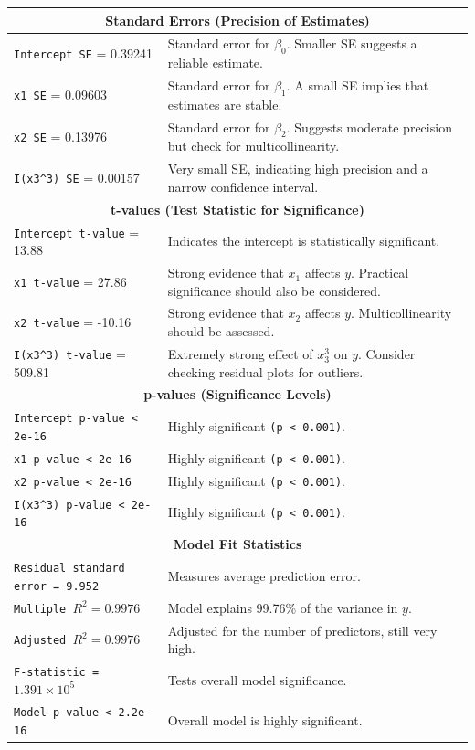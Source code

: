 \documentclass[]{article}
\begin{document}
\begin{longtable}{|p{}|p{}|}
	\hline
	\multicolumn{2}{|c|}{\textbf{Standard Errors (Precision of Estimates)}} \\
	\hline
	\texttt{Intercept SE} = 0.39241 & Standard error for $\beta_0$. Smaller SE suggests a reliable estimate. \\
	\hline
	\texttt{x1 SE} = 0.09603 & Standard error for $\beta_1$. A small SE implies that estimates are stable. \\
	\hline
	\texttt{x2 SE} = 0.13976 & Standard error for $\beta_2$. Suggests moderate precision but check for multicollinearity. \\
	\hline
	\texttt{I(x3\textasciicircum3) SE} = 0.00157 & Very small SE, indicating high precision and a narrow confidence interval. \\
	\hline
	\multicolumn{2}{|c|}{\textbf{t-values (Test Statistic for Significance)}} \\
	\hline
	\texttt{Intercept t-value} = 13.88 & Indicates the intercept is statistically significant. \\
	\hline
	\texttt{x1 t-value} = 27.86 & Strong evidence that $x_1$ affects $y$. Practical significance should also be considered. \\
	\hline
	\texttt{x2 t-value} = -10.16 & Strong evidence that $x_2$ affects $y$. Multicollinearity should be assessed. \\
	\hline
	\texttt{I(x3\textasciicircum3) t-value} = 509.81 & Extremely strong effect of $x_3^3$ on $y$. Consider checking residual plots for outliers. \\
	\hline


	\hline
	\multicolumn{2}{|c|}{\textbf{p-values (Significance Levels)}} \\
	\hline
	\texttt{Intercept p-value < 2e-16} & Highly significant \texttt{(p < 0.001)}. \\
	\hline
	\texttt{x1 p-value < 2e-16} & Highly significant \texttt{(p < 0.001)}. \\
	\hline
	\texttt{x2 p-value < 2e-16} & Highly significant \texttt{(p < 0.001)}. \\
	\hline
	\texttt{I(x3\textasciicircum3) p-value < 2e-16} & Highly significant \texttt{(p < 0.001)}. \\
	\hline

	\hline
	\multicolumn{2}{|c|}{\textbf{Model Fit Statistics}} \\
	\hline
	\texttt{Residual standard error = 9.952} & Measures average prediction error. \\
	\hline
	\texttt{Multiple $R^2 = 0.9976$} & Model explains 99.76\% of the variance in $y$. \\
	\hline
	\texttt{Adjusted $R^2 = 0.9976$} & Adjusted for the number of predictors, still very high. \\
	\hline
	\texttt{F-statistic = $1.391 \times 10^5$} & Tests overall model significance. \\
	\hline
	\texttt{Model p-value < 2.2e-16} & Overall model is highly significant. \\
	\hline
\end{longtable}
	
\end{document}
